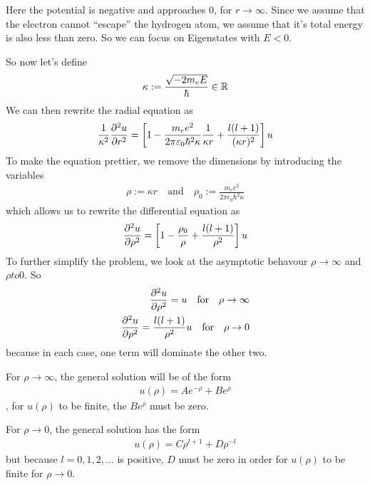 Here the potential is negative and approaches $0$, for $r \to \infty$. Since we assume that the electron cannot ``escape'' the hydrogen atom, we assume that it's total energy is also less than zero. So we can focus on Eigenstates with $E < 0$.

So now let's define
\begin{align*}
	\kappa := \frac{\sqrt{- 2 m_e E}}{\hbar} \in \mathbb{R}
\end{align*}
We can then rewrite the radial equation as
\begin{align*}
		\frac{1}{\kappa^2} \frac{\partial^2 u}{\partial r^2} 
	= 
		\left[
			1 - \frac{
				m_{e} e^{2}
			}{
				2\pi \varepsilon_0 \hbar^{2} \kappa
			} 
				\frac{1}{\kappa r} 
			+ 
				\frac{l(l+1)}{(\kappa r)^2}
		\right]u
\end{align*}
To make the equation prettier, we remove the dimensions by introducing the variables
\begin{align*}
	\rho := \kappa r \quad \text{and} \quad \rho_0 := \frac{m_e e^{2}}{2 \pi \epsilon_0 \hbar^{2} \kappa}
\end{align*}
which allows us to rewrite the differential equation as
\begin{align*}
	\frac{\partial^2 u}{\partial \rho^2} = \left[1 - \frac{\rho_0}{\rho} + \frac{l(l+1)}{\rho^{2}}\right]u
\end{align*}
To further simplify the problem, we look at the asymptotic behavour $\rho \to \infty$ and $\rho to 0$. So
\begin{align*}
	\frac{\partial^2 u}{\partial \rho^2} = u \quad \text{for} \quad \rho \to \infty\\
	\frac{\partial^2 u}{\partial \rho^2} = \frac{l(l+1)}{\rho^2}u \quad \text{for} \quad \rho \to 0
\end{align*} 
because in each case, one term will dominate the other two. 

For $\rho \to \infty$, the general solution will be of the form
\begin{align*}
	u(\rho) = Ae^{-\rho} + Be^{\rho}
\end{align*}
, for $u(\rho)$ to be finite, the $Be^{\rho}$ must be zero.

For $\rho \to 0$, the general solution has the form
\begin{align*}
	u(\rho) = C \rho^{l+1} + D \rho^{-l}
\end{align*}
but because $l = 0,1,2, \ldots$ is positive, $D$ must be zero in order for $u(\rho)$ to be finite for $\rho \to 0$.

